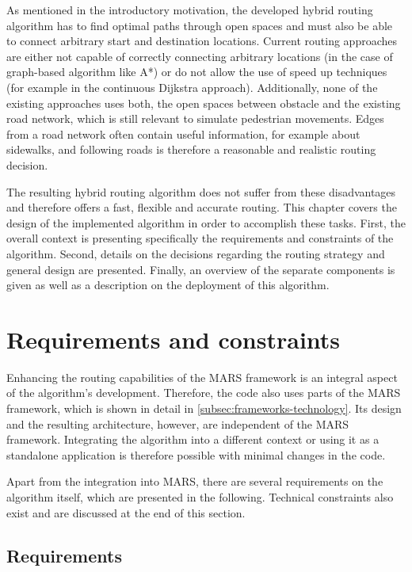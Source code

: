 
As mentioned in the introductory motivation, the developed hybrid routing algorithm has to find optimal paths through open spaces and must also be able to connect arbitrary start and destination locations.
Current routing approaches are either not capable of correctly connecting arbitrary locations (in the case of graph-based algorithm like A*) or do not allow the use of speed up techniques (for example in the continuous Dijkstra approach).
Additionally, none of the existing approaches uses both, the open spaces between obstacle and the existing road network, which is still relevant to simulate pedestrian movements.
Edges from a road network often contain useful information, for example about sidewalks, and following roads is therefore a reasonable and realistic routing decision.

The resulting hybrid routing algorithm does not suffer from these disadvantages and therefore offers a fast, flexible and accurate routing.
This chapter covers the design of the implemented algorithm in order to accomplish these tasks.
First, the overall context is presenting specifically the requirements and constraints of the algorithm.
Second, details on the decisions regarding the routing strategy and general design are presented.
Finally, an overview of the separate components is given as well as a description on the deployment of this algorithm.

\section{Requirements and constraints}
	
	Enhancing the routing capabilities of the MARS framework is an integral aspect of the algorithm's development.
	Therefore, the code also uses parts of the MARS framework, which is shown in detail in \cref{subsec:frameworks-technology}.
	Its design and the resulting architecture, however, are independent of the MARS framework.
	Integrating the algorithm into a different context or using it as a standalone application is therefore possible with minimal changes in the code.
	
	Apart from the integration into MARS, there are several requirements on the algorithm itself, which are presented in the following.
	Technical constraints also exist and are discussed at the end of this section.
	
	\subsection{Requirements}
	
